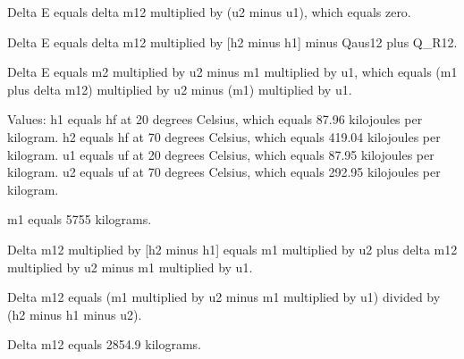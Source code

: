 Delta E equals delta m12 multiplied by (u2 minus u1), which equals zero.  

Delta E equals delta m12 multiplied by [h2 minus h1] minus Qaus12 plus Q_R12.  

Delta E equals m2 multiplied by u2 minus m1 multiplied by u1, which equals (m1 plus delta m12) multiplied by u2 minus (m1) multiplied by u1.  

Values:  
h1 equals hf at 20 degrees Celsius, which equals 87.96 kilojoules per kilogram.  
h2 equals hf at 70 degrees Celsius, which equals 419.04 kilojoules per kilogram.  
u1 equals uf at 20 degrees Celsius, which equals 87.95 kilojoules per kilogram.  
u2 equals uf at 70 degrees Celsius, which equals 292.95 kilojoules per kilogram.  

m1 equals 5755 kilograms.  

Delta m12 multiplied by [h2 minus h1] equals m1 multiplied by u2 plus delta m12 multiplied by u2 minus m1 multiplied by u1.  

Delta m12 equals (m1 multiplied by u2 minus m1 multiplied by u1) divided by (h2 minus h1 minus u2).  

Delta m12 equals 2854.9 kilograms.